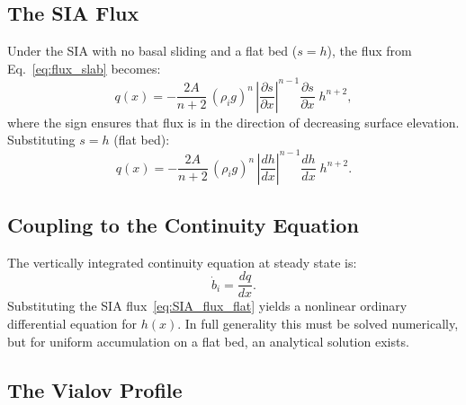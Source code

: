 \documentclass[11pt]{article}
\begin{document}

\subsection{The SIA Flux}

Under the SIA with no basal sliding and a flat bed ($s = h$), the flux from Eq.~\eqref{eq:flux_slab} becomes:
\begin{equation}
  q(x) = -\frac{2A}{n+2}\,(\rho_i g)^n\,\left|\frac{\partial s}{\partial x}\right|^{n-1}\frac{\partial s}{\partial x}\;h^{n+2},
  \label{eq:SIA_flux}
\end{equation}
where the sign ensures that flux is in the direction of decreasing surface elevation.  Substituting $s = h$ (flat bed):
\begin{equation}
  q(x) = -\frac{2A}{n+2}\,(\rho_i g)^n\,\left|\frac{dh}{dx}\right|^{n-1}\frac{dh}{dx}\;h^{n+2}.
  \label{eq:SIA_flux_flat}
\end{equation}

\subsection{Coupling to the Continuity Equation}

The vertically integrated continuity equation at steady state is:
\begin{equation}
  \dot{b}_i = \frac{dq}{dx}.
  \label{eq:steady_continuity}
\end{equation}
Substituting the SIA flux~\eqref{eq:SIA_flux_flat} yields a nonlinear ordinary differential equation for $h(x)$.  In full generality this must be solved numerically, but for uniform accumulation on a flat bed, an analytical solution exists.

\subsection{The Vialov Profile}
\label{sec:vialov}
\end{document}
